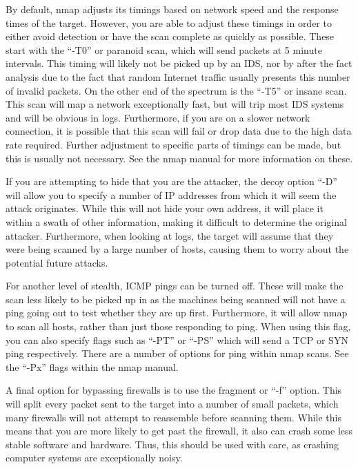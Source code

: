 			By default, nmap adjusts its timings based on network speed and the response times of the target. 
			However, you are able to adjust these timings in order to either avoid detection or have the scan complete as quickly as possible. 
			These start with the ``-T0'' or paranoid scan, which will send packets at 5 minute intervals. 
			This timing will likely not be picked up by an IDS, nor by after the fact analysis due to the fact that random Internet traffic usually presents this number of invalid packets. 
			On the other end of the spectrum is the ``-T5''  or insane scan. 
			This scan will map a network exceptionally fast, but will trip most IDS systems and will be obvious in logs. 
			Furthermore, if you are on a slower network connection, it is possible that this scan will fail or drop data due to the high data rate required. 
			Further adjustment to specific parts of timings can be made, but this is usually not necessary. 
			See the nmap manual for more information on these. 

			If you are attempting to hide that you are the attacker, the decoy option ``-D'' will allow you to specify a number of IP addresses from which it will seem the attack originates.
			While this will not hide your own address, it will place it within a swath of other information, making it difficult to determine the original attacker. 
			Furthermore, when looking at logs, the target will assume that they were being scanned by a large number of hosts, causing them to worry about the potential future attacks. 

			For another level of stealth, ICMP pings can be turned off.
			These will make the scan less likely to be picked up in as the machines being scanned will not have a ping going out to test whether they are up first. 
			Furthermore, it will allow nmap to scan all hosts, rather than just those responding to ping. 
			When using this flag, you can also specify flags such as ``-PT'' or ``-PS'' which will send a TCP or SYN ping respectively. 
			There are a number of options for ping within nmap scans. See the ``-Px'' flags within the nmap manual. 

			A final option for bypassing firewalls is to use the fragment or ``-f'' option. 
			This will split every packet sent to the target into a number of small packets, which many firewalls will not attempt to reassemble before scanning them. 
			While this means that you are more likely to get past the firewall, it also can crash some less stable software and hardware. 
			Thus, this should be used with care, as crashing computer systems are exceptionally noisy. 
